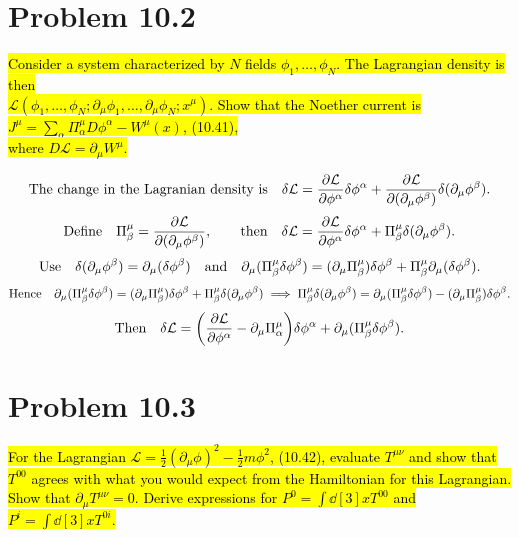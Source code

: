 \documentclass{article}
\begin{document}
\section*{Problem 10.2}
\begin{quoting}
    \hl{Consider a system characterized by $N$ fields $\phi_1,\dots,\phi_N$. The Lagrangian density is then\\ $\mathcal{L}(\phi_1,\dots,\phi_N;\partial_\mu \phi_1,\dots,\partial_\mu \phi_N;x^\mu)$. Show that the Noether current is $J^\mu=\sum_\alpha \Pi_\alpha^\mu  D\phi^\alpha-W^\mu(x)$, (10.41),\\ where $D\mathcal{L}=\partial_\mu W^\mu$.}
\end{quoting}

\[\qq*{The change in the Lagranian density is}\delta\mathcal{L}=\pdv{\mathcal{L}}{\phi^\alpha}\delta\phi^\alpha+\pdv{\mathcal{L}}{(\partial_\mu \phi^\beta)}\delta(\partial_\mu \phi^\beta).\]
\[\qq*{Define}\Pi^\mu_\beta=\pdv{\mathcal{L}}{(\partial_\mu \phi^\beta)}\qcomma \qthen \delta\mathcal{L}=\pdv{\mathcal{L}}{\phi^\alpha}\delta\phi^\alpha+\Pi^\mu_\beta \delta(\partial_\mu \phi^\beta).\]
\[\qq*{Use}\delta(\partial_\mu \phi^\beta)=\partial_\mu (\delta\phi^\beta)\qand\partial_\mu (\Pi^\mu_\beta \delta\phi^\beta)=(\partial_\mu \Pi^\mu_\beta) \delta\phi^\beta+\Pi^\mu_\beta \partial_\mu (\delta\phi^\beta).\]
\[\qq*{Hence}\partial_\mu (\Pi^\mu_\beta \delta\phi^\beta)=(\partial_\mu \Pi^\mu_\beta) \delta\phi^\beta+\Pi^\mu_\beta \delta(\partial_\mu \phi^\beta)\implies\Pi^\mu_\beta \delta(\partial_\mu \phi^\beta)=\partial_\mu (\Pi^\mu_\beta \delta\phi^\beta)-(\partial_\mu \Pi^\mu_\beta) \delta\phi^\beta.\]
\[\qq*{Then}\delta\mathcal{L}=\pqty{\pdv{\mathcal{L}}{\phi^\alpha}-\partial_\mu \Pi^\mu_\alpha}\delta\phi^\alpha+\partial_\mu (\Pi^\mu_\beta \delta\phi^\beta).\]


\section*{Problem 10.3}
\begin{quoting}
    \hl{For the Lagrangian $\mathcal{L}=\frac{1}{2}(\partial_\mu \phi)^2-\frac{1}{2}m\phi^2$, (10.42), evaluate $T^{\mu\nu}$ and show that $T^{00}$ agrees with what you would expect from the Hamiltonian for this Lagrangian. Show that $\partial_\mu T^{\mu\nu}=0$. Derive expressions for $P^0=\int\dd[3]{x}T^{00}$ and $P^i=\int\dd[3]{x}T^{0i}$.}
\end{quoting}
\end{document}
